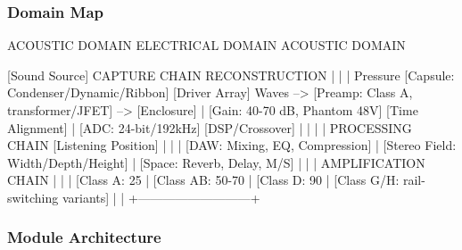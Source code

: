 \documentclass[11pt,letterpaper]{article}
\begin{document}
\subsubsection{Domain Map}

\begin{asciibox}
ACOUSTIC DOMAIN              ELECTRICAL DOMAIN             ACOUSTIC DOMAIN
                                                           
[Sound Source]               CAPTURE CHAIN                 RECONSTRUCTION
      |                           |                              |
   Pressure          [Capsule: Condenser/Dynamic/Ribbon]    [Driver Array]
    Waves        -->  [Preamp: Class A, transformer/JFET] --> [Enclosure]
      |               [Gain: 40-70 dB, Phantom 48V]        [Time Alignment]
      |               [ADC: 24-bit/192kHz]                 [DSP/Crossover]
      |                           |                              |
      |               PROCESSING CHAIN                  [Listening Position]
      |                           |
      |          [DAW: Mixing, EQ, Compression]
      |          [Stereo Field: Width/Depth/Height]
      |          [Space: Reverb, Delay, M/S]
      |                           |
      |               AMPLIFICATION CHAIN
      |                           |
      |          [Class A: 25%
      |          [Class AB: 50-70%
      |          [Class D: 90%
      |          [Class G/H: rail-switching variants]
      |                           |
      +---------------------------+
\end{asciibox}

\subsubsection{Module Architecture}
\end{document}
